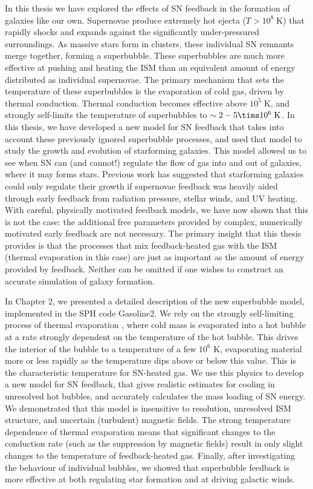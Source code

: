 In this thesis we have explored the effects of SN feedback in the formation of
galaxies like our own.  Supernovae produce extremely hot ejecta
($T>10^8\;\mathrm{K}$) that rapidly shocks and expands against the significantly
under-pressured surroundings.  As massive stars form in clusters, these
individual SN remnants merge together, forming a superbubble.  These
superbubbles are much more effective at pushing and heating the ISM than an
equivalent amount of energy distributed as individual supernovae.  The primary
mechanism that sets the temperature of these superbubbles is the evaporation of
cold gas, driven by thermal conduction.  Thermal conduction becomes effective
above $10^5\;\mathrm{K}$, and strongly self-limits the temperature of
superbubbles to $\sim2-5\tims10^6\;\mathrm{K}$.  In this thesis, we have
developed a new model for SN feedback that takes into account these previously
ignored superbubble processes, and used that model to study the growth and
evolution of starforming galaxies.  This model allowed us to see when SN can
(and cannot!) regulate the flow of gas into and out of galaxies, where it may
forms stars.  Previous work \citep{Stinson2013,Hopkins2014} has suggested that
starforming galaxies could only regulate their growth if supernovae feedback was
heavily aided through early feedback from radiation pressure, stellar winds, and
UV heating.  With careful, physically motivated feedback models, we have now
shown that this is not the case:  the additional free parameters provided by
complex, numerically motivated early feedback are not necessary.  The primary
insight that this thesis provides is that the processes that mix feedback-heated
gas with the ISM (thermal evaporation in this case) are just as important as the
amount of energy provided by feedback.  Neither can be omitted if one wishes to
construct an accurate simulation of galaxy formation.  

In Chapter 2, we presented a detailed description of the new superbubble model,
implemented in the SPH code {\sc Gasoline2}.  We rely on the strongly
self-limiting process of thermal evaporation \citep{Cowie1977}, where cold mass
is evaporated into a hot bubble at a rate strongly dependent on the temperature
of the hot bubble. This drives the interior of the bubble to a temperature of a
few $10^6$ K, evaporating material more or less rapidly as the temperature dips
above or below this value.  This is the characteristic temperature for SN-heated
gas.  We use this physics to develop a new model for SN feedback, that gives
realistic estimates for cooling in unresolved hot bubbles, and accurately
calculates the mass loading of SN energy.  We demonstrated that this model is
insensitive to resolution, unresolved ISM structure, and uncertain (turbulent)
magnetic fields.  The strong temperature dependence of thermal evaporation means
that significant changes to the conduction rate (such as the suppression by
magnetic fields) result in only slight changes to the temperature of
feedback-heated gas.  Finally, after investigating the behaviour of individual
bubbles, we showed that superbubble feedback is more effective at both
regulating star formation and at driving galactic winds.

